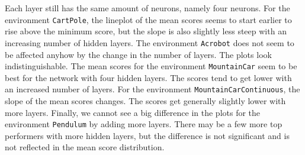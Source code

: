 Each layer still has the same amount of neurons, namely four neurons. For the environment \verb|CartPole|, the lineplot of the mean scores seems to start earlier to rise above the minimum score, but the slope is also slightly less steep with an increasing number of hidden layers. The environment \verb|Acrobot| does not seem to be affected anyhow by the change in the number of layers. The plots look indistinguishable. The mean scores for the environment \verb|MountainCar| seem to be best for the network with four hidden layers. The scores tend to get lower with an increased number of layers. For the environment \verb|MountainCarContinuous|, the slope of the mean scores changes. The scores get generally slightly lower with more layers. Finally, we cannot see a big difference in the plots for the environment \verb|Pendulum| by adding more layers. There may be a few more top performers with more hidden layers, but the difference is not significant and is not reflected in the mean score distribution.

